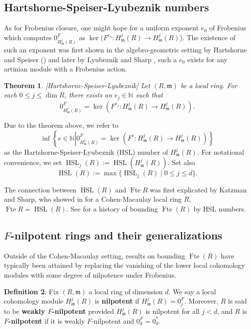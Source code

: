 \documentclass{amsproc}
\newtheorem{theorem}{Theorem}[section]
\theoremstyle{definition}
\newtheorem{definition}[theorem]{Definition}
\theoremstyle{remark}
\numberwithin{equation}{section}
\newcommand{\fm}{\mathfrak{m}}
\newcommand{\fte}{\operatorname{Fte}}
\newcommand{\HSL}{\operatorname{HSL}}
\begin{document}
\subsection{Hartshorne-Speiser-Lyubeznik numbers}\label{sec:HSL}

As for Frobenius closure, one might hope for a uniform exponent $e_0$ of Frobenius which computes $0^F_{H^j_\fm(R)}$ as $\ker(F^{e_0}:H^j_\fm(R)\rightarrow H^j_\fm(R)$). The existence of such an exponent was first shown in the algebro-geometric setting by Hartshorne and Speiser (\cite[Prop. 1.11]{HS77}) and later by Lyubeznik \cite[Prop. 4.4]{Lyu97} and Sharp \cite{Sha07}, such a $e_0$ exists for any artinian module with a Frobenius action. 

\begin{theorem}\label{thm:HSL}[Hartshorne-Speiser-Lyubeznik] Let $(R,\fm)$ be a local ring. For each $0 \leq j \leq \dim R$, there exists an $e_j \in \mathbb{N}$ such that \[0^F_{H^j_\fm(R)} = \ker \left(F^{e_j}:H^j_\fm(R) \rightarrow H^j_\fm(R)\right).\]  
\end{theorem}

Due to the theorem above, we refer to 
\[\inf \left\{ e \in \mathbb{N} \left| 0^F_{H^j_\fm(R)} = \ker(F^e:H^j_\fm(R)\rightarrow H^j_\fm(R)) \right. \right\} \] as the Hartshorne-Speiser-Lyubeznik (HSL) number of $H^j_\fm(R)$. For notational convenience, we set $\HSL_j(R) := \HSL(H_\fm^j(R))$. Set also $$\HSL(R) := \max \{ \HSL_j(R) \mid 0\le j \le d \}.$$

The connection between $\HSL(R)$ and $\fte R$ was first explicated by Katzman and Sharp, who showed in \cite{KS06} for a Cohen-Macaulay local ring $R$, $\fte R = \HSL(R)$. See  for a history of bounding $\fte(R)$ by HSL numbers.

\subsection{\texorpdfstring{$F$}{F}-nilpotent rings and their generalizations}\label{sec:Fnil} Outside of the Cohen-Macaulay setting, results on bounding $\fte(R)$ have typically been attained by replacing the vanishing of the lower local cohomology modules with some degree of nilpotence under Frobenius.  

\begin{definition}
Fix $(R,\fm)$ a local ring of dimension $d$. We say a local cohomology module $H_\fm^j(R)$ is {\bf nilpotent} if $H_\fm^j(R) = 0^F_j$. Moreover, $R$ is said to be {\bf weakly $F$-nilpotent} provided $H_\fm^j(R)$ is nilpotent for all $j < d$, and $R$ is {\bf $F$-nilpotent} if it is weakly $F$-nilpotent and $0^F_{d} = 0^*_{d}$.
\end{definition}
\end{document}
